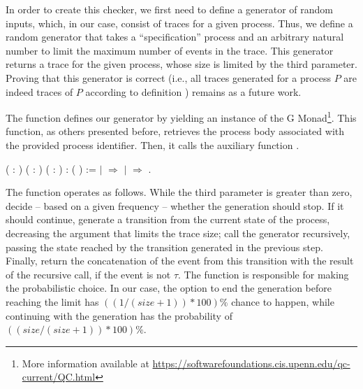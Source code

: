 In order to create this checker, we first need to define a generator of random inputs, which, in our case, consist of traces for a given process. Thus, we define a random generator that takes a ``specification'' process and an arbitrary natural number to limit the maximum number of events in the trace. This generator returns a trace for the given process, whose size is limited by the third parameter. Proving that this generator is correct (i.e., all traces generated for a process $P$ are indeed traces of $P$ according to definition ) remains as a future work.

The function  defines our generator by yielding an instance of the G Monad\footnote{More information available at \url{https://softwarefoundations.cis.upenn.edu/qc-current/QC.html}}. This function, as others presented before, retrieves the process body associated with the provided process identifier. Then, it calls the auxiliary function .

\begin{coqdoccode}
	\coqdocnoindent
	 \coqdoceol
	\coqdocindent{1.00em}
	( : ) ( : ) ( : )\coqdoceol
	\coqdocindent{1.00em}
	:  ( ) :=\coqdoceol
	\coqdocindent{1.00em}
	    \coqdoceol
	\coqdocindent{1.00em}
	\ensuremath{|}  \ensuremath{\Rightarrow}  \coqdoceol
	\coqdocindent{1.00em}
	\ensuremath{|}   \ensuremath{\Rightarrow}    \coqdoceol
	\coqdocindent{1.00em}
	.\coqdoceol
\end{coqdoccode}

The function  operates as follows. While the third parameter is greater than zero, decide -- based on a given frequency -- whether the generation should stop. If it should continue, generate a transition from the current state of the process, decreasing the argument that limits the trace size; call the generator recursively, passing the state reached by the transition generated in the previous step. Finally, return the concatenation of the event from this transition with the result of the recursive call, if the event is not $\tau$. The function  is responsible for making the probabilistic choice. In our case, the option to end the generation before reaching the limit has $ ((1 / (size + 1)) * 100)\% $ chance to happen, while continuing with the generation has the probability of $ ((size / (size + 1)) * 100)\% $.

